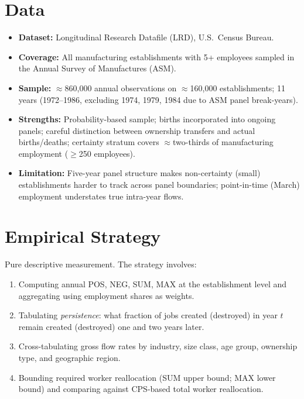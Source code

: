\section{Data}

\begin{itemize}
  \item \textbf{Dataset:} Longitudinal Research Datafile (LRD), U.S.\ Census
    Bureau.
  \item \textbf{Coverage:} All manufacturing establishments with 5+ employees
    sampled in the Annual Survey of Manufactures (ASM).
  \item \textbf{Sample:} $\approx$860,000 annual observations on
    $\approx$160,000 establishments; 11 years (1972--1986, excluding 1974,
    1979, 1984 due to ASM panel break-years).
  \item \textbf{Strengths:} Probability-based sample; births incorporated
    into ongoing panels; careful distinction between ownership transfers and
    actual births/deaths; certainty stratum covers $\approx$two-thirds of
    manufacturing employment ($\geq$250 employees).
  \item \textbf{Limitation:} Five-year panel structure makes non-certainty
    (small) establishments harder to track across panel boundaries; point-in-time
    (March) employment understates true intra-year flows.
\end{itemize}

\section{Empirical Strategy}

Pure descriptive measurement. The strategy involves:
\begin{enumerate}
  \item Computing annual POS, NEG, SUM, MAX at the establishment level and
    aggregating using employment shares as weights.
  \item Tabulating \emph{persistence}: what fraction of jobs created (destroyed)
    in year $t$ remain created (destroyed) one and two years later.
  \item Cross-tabulating gross flow rates by industry, size class, age group,
    ownership type, and geographic region.
  \item Bounding required worker reallocation (SUM upper bound; MAX lower
    bound) and comparing against CPS-based total worker reallocation.
\end{enumerate}

